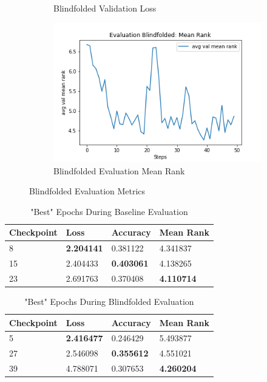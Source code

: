 \begin{figure}[ht!]
\begin{subfigure}[b]{0.3\textwidth}
         \caption{Blindfolded Validation Loss}
         \label{fig:blindfolded_loss}
     \end{subfigure}
     \hfill
     \begin{subfigure}[b]{0.3\textwidth}
         \centering
         \includegraphics[width=\textwidth]{./figure/results/baseline_and_blindfolding/blindfolded/avg val mean rank.png}
         \caption{Blindfolded Evaluation Mean Rank}
         \label{fig:blindfolded_mean_rank}
     \end{subfigure}
     \caption{Blindfolded Evaluation Metrics}
     \label{fig:blindfolded_metrics}
\end{figure}

\begin{table}[ht!]
\centering
\caption{"Best" Epochs During Baseline Evaluation}
\begin{tabular}{l | l | l | l}
Checkpoint & Loss & Accuracy & Mean Rank \\
\hline
8 & \textbf{2.204141} & 0.381122 & 4.341837 \\
15 & 2.404433 & \textbf{0.403061} & 4.138265 \\
23 & 2.691763 & 0.370408 & \textbf{4.110714}
\end{tabular}
\label{tab:best_baseline}
\end{table}

\begin{table}[ht!]
\centering
\caption{"Best" Epochs During Blindfolded Evaluation}
\begin{tabular}{l | l | l | l}
Checkpoint & Loss & Accuracy & Mean Rank \\
\hline
5 & \textbf{2.416477} & 0.246429 & 5.493877 \\
27 & 2.546098 & \textbf{0.355612} & 4.551021 \\
39 & 4.788071 & 0.307653 & \textbf{4.260204}
\end{tabular}
\label{tab:best_blindfolded}
\end{table}


